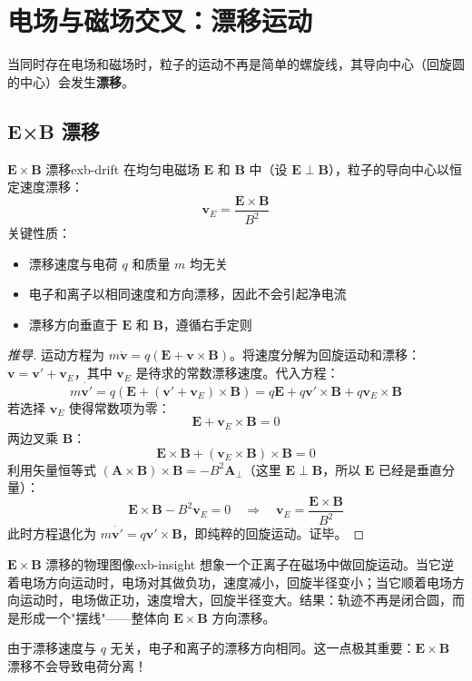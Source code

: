 \documentclass[12pt,a4paper,openany,oneside]{book}
\newcommand{\vect}[1]{\bm{#1}}
\newcommand{\difficulty}[1]{\marginnote{\textcolor{red}{\textbf{[#1]}}}}
\begin{document}
\section{电场与磁场交叉：漂移运动}\difficulty{基础}

当同时存在电场和磁场时，粒子的运动不再是简单的螺旋线，其导向中心（回旋圆的中心）会发生\textbf{漂移}。

\subsection{E×B 漂移}

\begin{theorem}{$\vect{E}\times\vect{B}$ 漂移}{exb-drift}
在均匀电磁场 $\vect{E}$ 和 $\vect{B}$ 中（设 $\vect{E}\perp\vect{B}$），粒子的导向中心以恒定速度漂移：
\[
\vect{v}_E = \frac{\vect{E}\times\vect{B}}{B^2}
\]
关键性质：
\begin{itemize}
\item 漂移速度与电荷 $q$ 和质量 $m$ 均无关
\item 电子和离子以相同速度和方向漂移，因此不会引起净电流
\item 漂移方向垂直于 $\vect{E}$ 和 $\vect{B}$，遵循右手定则
\end{itemize}
\end{theorem}

\begin{proof}[推导]
运动方程为 $m\dot{\vect{v}} = q(\vect{E} + \vect{v}\times\vect{B})$。将速度分解为回旋运动和漂移：$\vect{v} = \vect{v}' + \vect{v}_E$，其中 $\vect{v}_E$ 是待求的常数漂移速度。代入方程：
\[
m\dot{\vect{v}'} = q(\vect{E} + (\vect{v}' + \vect{v}_E)\times\vect{B}) = q\vect{E} + q\vect{v}'\times\vect{B} + q\vect{v}_E\times\vect{B}
\]
若选择 $\vect{v}_E$ 使得常数项为零：
\[
\vect{E} + \vect{v}_E\times\vect{B} = 0
\]
两边叉乘 $\vect{B}$：
\[
\vect{E}\times\vect{B} + (\vect{v}_E\times\vect{B})\times\vect{B} = 0
\]
利用矢量恒等式 $(\vect{A}\times\vect{B})\times\vect{B} = -B^2\vect{A}_\perp$（这里 $\vect{E}\perp\vect{B}$，所以 $\vect{E}$ 已经是垂直分量）：
\[
\vect{E}\times\vect{B} - B^2\vect{v}_E = 0 \quad\Rightarrow\quad \vect{v}_E = \frac{\vect{E}\times\vect{B}}{B^2}
\]
此时方程退化为 $m\dot{\vect{v}'} = q\vect{v}'\times\vect{B}$，即纯粹的回旋运动。证毕。
\end{proof}

\begin{insight}{$\vect{E}\times\vect{B}$ 漂移的物理图像}{exb-insight}
想象一个正离子在磁场中做回旋运动。当它逆着电场方向运动时，电场对其做负功，速度减小，回旋半径变小；当它顺着电场方向运动时，电场做正功，速度增大，回旋半径变大。结果：轨迹不再是闭合圆，而是形成一个"摆线"——整体向 $\vect{E}\times\vect{B}$ 方向漂移。

由于漂移速度与 $q$ 无关，电子和离子的漂移方向相同。这一点极其重要：$\vect{E}\times\vect{B}$ 漂移不会导致电荷分离！
\end{insight}
\end{document}
